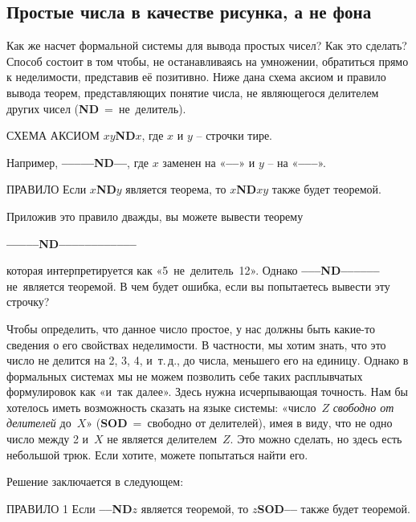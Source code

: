 \documentclass[../main.tex]{subfiles}
\begin{document}
\subsection{Простые числа в качестве рисунка, а не фона}

Как же насчет формальной системы для вывода простых чисел? Как это сделать? Способ состоит в том чтобы, не останавливаясь на умножении, обратиться прямо к неделимости, представив её позитивно. Ниже дана схема аксиом и правило вывода теорем, представляющих понятие числа, не являющегося делителем других чисел (\textbf{ND}~=~не~делитель).

\begin{mybox}{СХЕМА АКСИОМ}
    \textbf{$xy$ND$x$}, где $x$ и $y$ \--- строчки тире.
\end{mybox}

Например, \textbf{--{}--{}--{}--{}--ND--{}--}, где $x$ заменен на «\textbf{--{}--}» и $y$ \--- на «\textbf{--{}--{}--}».

\begin{mybox}{ПРАВИЛО}
    Если \textbf{$x$ND$y$} является теорема, то \textbf{$x$ND$xy$} также будет теоремой.
\end{mybox}

Приложив это правило дважды, вы можете вывести теорему
%
\begin{center}
    \textbf{--{}--{}--{}--{}--ND--{}--{}--{}--{}--{}--{}--{}--{}--{}--{}--{}--}
\end{center}
%
которая интерпретируется как «5~не~делитель~12». Однако \textbf{--{}--{}--ND--{}--{}--{}--{}--{}--} не~является теоремой. В чем будет ошибка, если вы попытаетесь вывести эту строчку?

Чтобы определить, что данное число простое, у нас должны быть какие-то сведения о его свойствах неделимости. В частности, мы хотим знать, что это число не делится на 2, 3, 4, и~т.\,д., до числа, меньшего его на единицу. Однако в формальных системах мы не можем позволить себе таких расплывчатых формулировок как «и~так далее». Здесь нужна исчерпывающая точность. Нам бы хотелось иметь возможность сказать на языке системы: «число~$Z$ \emph{свободно от делителей} до~$X$» (\textbf{SOD}~=~свободно от делителей), имея в виду, что не одно число между 2 и~$X$ не является делителем~$Z$. Это можно сделать, но здесь есть небольшой трюк. Если хотите, можете попытаться найти его.

Решение заключается в следующем:

\begin{mybox}{ПРАВИЛО 1}
    Если \textbf{--{}--ND$z$} является теоремой, то \textbf{$z$SOD--{}--} также будет теоремой.
\end{mybox}
\end{document}
